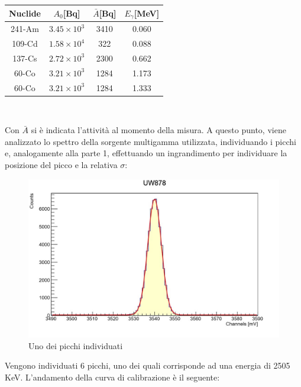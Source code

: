 \documentclass[a4paper,10pt]{article}
\begin{document}
\begin{center}
    \begin{tabular}{cccc}
        \toprule
        Nuclide & $A_{0}$[Bq] & $\bar{A}$[Bq] & $E_{\gamma}$[MeV]\\
        \midrule
         241-Am & $3.45 \times 10^3$ & 3410 & 0.060\\
	  109-Cd & $1.58 \times 10^4$ & 322 & 0.088\\
	  137-Cs & $2.72 \times 10^3$ & 2300 & 0.662\\
	  60-Co & $3.21 \times 10^3$ & 1284 & 1.173\\
	  60-Co & $3.21 \times 10^3$ & 1284 & 1.333\\
        \bottomrule
    \end{tabular}\\
\end{center}

\noindent Con $\bar{A}$ si \`e indicata l'attivit\`a al momento della misura.
\noindent A questo punto, viene analizzato lo spettro della sorgente multigamma utilizzata, individuando i picchi e, analogamente alla parte 1, effettuando un ingrandimento per individuare la posizione del picco e la relativa $\sigma$:

\begin{figure}[H]
    \centering
    \includegraphics[scale=0.6]{grafici/piccouw878}
    \caption{Uno dei picchi individuati}
\end{figure}

\noindent Vengono individuati 6 picchi, uno dei quali corrisponde ad una energia di 2505 KeV. L'andamento della curva di calibrazione \`e il seguente:
\end{document}
